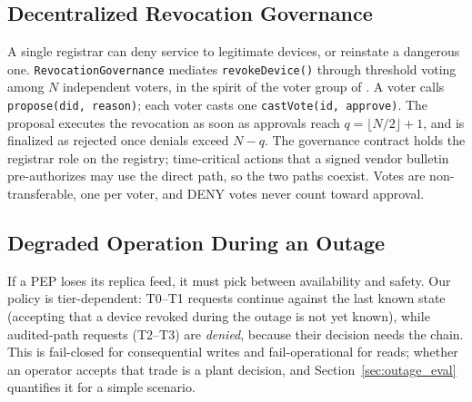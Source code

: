 \subsection{Decentralized Revocation Governance}\label{sec:governance}
A single registrar can deny service to legitimate devices, or reinstate a dangerous one. \texttt{RevocationGovernance} mediates \texttt{revokeDevice()} through threshold voting among $N$ independent voters, in the spirit of the voter group of \cite{kumar2026privacy}. A voter calls \texttt{propose(did, reason)}; each voter casts one \texttt{castVote(id, approve)}. The proposal executes the revocation as soon as approvals reach $q=\lfloor N/2\rfloor+1$, and is finalized as rejected once denials exceed $N-q$. The governance contract holds the registrar role on the registry; time-critical actions that a signed vendor bulletin pre-authorizes may use the direct path, so the two paths coexist. Votes are non-transferable, one per voter, and DENY votes never count toward approval.

\subsection{Degraded Operation During an Outage}\label{sec:outage}
If a PEP loses its replica feed, it must pick between availability and safety. Our policy is tier-dependent: T0--T1 requests continue against the last known state (accepting that a device revoked during the outage is not yet known), while audited-path requests (T2--T3) are \emph{denied}, because their decision needs the chain. This is fail-closed for consequential writes and fail-operational for reads; whether an operator accepts that trade is a plant decision, and Section~\ref{sec:outage_eval} quantifies it for a simple scenario.
